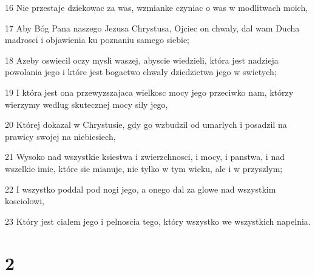 \par 16 Nie przestaje dziekowac za was, wzmianke czyniac o was w modlitwach moich,
\par 17 Aby Bóg Pana naszego Jezusa Chrystusa, Ojciec on chwaly, dal wam Ducha madrosci i objawienia ku poznaniu samego siebie;
\par 18 Azeby oswiecil oczy mysli waszej, abyscie wiedzieli, która jest nadzieja powolania jego i które jest bogactwo chwaly dziedzictwa jego w swietych;
\par 19 I która jest ona przewyzszajaca wielkosc mocy jego przeciwko nam, którzy wierzymy wedlug skutecznej mocy sily jego,
\par 20 Której dokazal w Chrystusie, gdy go wzbudzil od umarlych i posadzil na prawicy swojej na niebiesiech,
\par 21 Wysoko nad wszystkie ksiestwa i zwierzchnosci, i mocy, i panstwa, i nad wszelkie imie, które sie mianuje, nie tylko w tym wieku, ale i w przyszlym;
\par 22 I wszystko poddal pod nogi jego, a onego dal za glowe nad wszystkim kosciolowi,
\par 23 Który jest cialem jego i pelnoscia tego, który wszystko we wszystkich napelnia.

\chapter{2}

